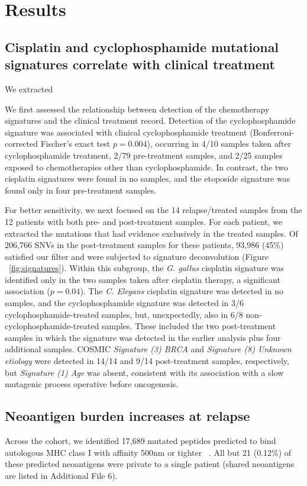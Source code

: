 \section*{Results}

\subsection*{Cisplatin and cyclophosphamide mutational signatures correlate with clinical treatment}
We extracted

We first assessed the relationship between detection of the chemotherapy signatures and the clinical treatment record. Detection of the cyclophosphamide signature was associated with clinical cyclophosphamide treatment (Bonferroni-corrected Fischer's exact test $p = 0.004$), occurring in 4/10 samples taken after cyclophosphamide treatment, 2/79 pre-treatment samples, and 2/25 samples exposed to chemotherapies other than cyclophosphamide. In contrast, the two cisplatin signatures were found in no samples, and the etoposide signature was found only in four pre-treatment samples.

For better sensitivity, we next focused on the 14 relapse/treated samples from the 12 patients with both pre- and post-treatment samples. For each patient, we extracted the mutations that had evidence exclusively in the treated samples. Of 206,766 SNVs in the post-treatment samples for these patients, 93,986 (45\%) satisfied our filter and were subjected to signature deconvolution (Figure ~\ref{fig:signatures}). Within this subgroup, the \textit{G. gallus} cisplatin signature was identified only in the two samples taken after cisplatin therapy, a significant association ($p = 0.04$). The \textit{C. Elegans} cisplatin signature was detected in no samples, and the cyclophosphamide signature was detected in 3/6 cyclophosphamide-treated samples, but, unexpectedly, also in 6/8 non-cyclophosphamide-treated samples. These included the two post-treatment samples in which the signature was detected in the earlier analysis plus four additional samples. COSMIC \textit{Signature (3) BRCA} and \textit{Signature (8) Unknown etiology} were detected in 14/14 and 9/14 post-treatment samples, respectively, but \textit{Signature (1) Age} was absent, consistent with its association with a slow mutagenic process operative before oncogenesis.

\subsection*{Neoantigen burden increases at relapse}
Across the cohort, we identified 17,689 mutated peptides predicted to bind autologous MHC class I with affinity 500nm or tighter ~\cite{Sette1994}. All but 21 (0.12\%) of these predicted neoantigens were private to a single patient (shared neoantigens are listed in Additional File 6).

